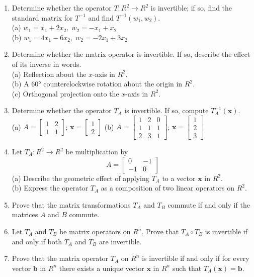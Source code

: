 \documentclass{article}
\theoremstyle{mystyle}
\begin{document}
\begin{enumerate}
\item[19.] Determine whether the operator $T:R^2\to R^2$ is invertible; if so, find the standard matrix for $T^{-1}$ and find $T^{-1}(w_1,w_2)$.\\
(a) $w_1=x_1+2x_2,\; w_2=-x_1+x_2$\\
(b) $w_1=4x_1-6x_2,\; w_2=-2x_1+3x_2$

\item[21.] Determine whether the matrix operator is invertible. If so, describe the effect of its inverse in words.\\
(a) Reflection about the $x$-axis in $R^2$.\\
(b) A $60°$ counterclockwise rotation about the origin in $R^2$.\\
(c) Orthogonal projection onto the $x$-axis in $R^2$.

\item[23.] Determine whether the operator $T_A$ is invertible. If so, compute $T_A^{-1}(\mathbf{x})$.\\
(a) $A=\begin{bmatrix}1&2\\1&1\end{bmatrix}$;\; $\mathbf{x}=\begin{bmatrix}1\\2\end{bmatrix}$\qquad
(b) $A=\begin{bmatrix}1&2&0\\1&1&1\\2&3&1\end{bmatrix}$;\; $\mathbf{x}=\begin{bmatrix}1\\2\\3\end{bmatrix}$

\item[25.] Let $T_A:R^2\to R^2$ be multiplication by
\[
A=\begin{bmatrix}0&-1\\-1&0\end{bmatrix}
\]
(a) Describe the geometric effect of applying $T_A$ to a vector $\mathbf{x}$ in $R^2$.\\
(b) Express the operator $T_A$ as a composition of two linear operators on $R^2$.

\item[27.] Prove that the matrix transformations $T_A$ and $T_B$ commute if and only if the matrices $A$ and $B$ commute.

\item[28.] Let $T_A$ and $T_B$ be matrix operators on $R^n$. Prove that $T_A\circ T_B$ is invertible if and only if both $T_A$ and $T_B$ are invertible.

\item[29.] Prove that the matrix operator $T_A$ on $R^n$ is invertible if and only if for every vector $\mathbf{b}$ in $R^n$ there exists a unique vector $\mathbf{x}$ in $R^n$ such that $T_A(\mathbf{x})=\mathbf{b}$.
\end{enumerate}
\end{document}
